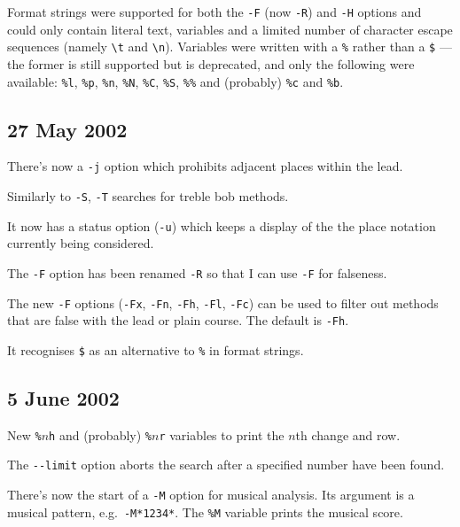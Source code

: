 \documentclass[a4paper,11pt,oneside]{book}
\begin{document}
Format strings were supported for both the \verb+-F+ (now \verb+-R+) and 
\verb+-H+ options and could only contain literal text, variables
and a limited number of character escape sequences (namely \verb+\t+ and 
\verb+\n+).
Variables were written with a \verb+%+ rather than a \verb+$+ — the former
is still supported but is deprecated, and only the following were available:
\verb+%l+, \verb+%p+, \verb+%n+, \verb+%N+, \verb+%C+, \verb+%S+, \verb+%%+ 
and (probably) \verb+%c+ and \verb+%b+.

\subsection{27 May 2002}
\begin{list}{}{\leftmargin=1em\itemsep=0em}
\item There's now a \verb+-j+ option which prohibits adjacent places 
within the lead.
\item Similarly to \verb+-S+, \verb+-T+ searches for treble bob methods.
\item It now has a status option (\verb+-u+) which keeps a display of the 
the place notation currently being considered.
\item The \verb+-F+ option has been renamed \verb+-R+ so that I can use 
\verb+-F+ for falseness.
\item The new \verb+-F+ options (\verb+-Fx+, \verb+-Fn+, \verb+-Fh+, 
\verb+-Fl+, \verb+-Fc+) can be used to filter out methods that are 
false with the lead or plain course.  The default is \verb+-Fh+.
\item It recognises \verb+$+ as an alternative to \verb+%+ in format strings.
\end{list}

\subsection{5 June 2002}
\begin{list}{}{\leftmargin=1em\itemsep=0em}
\item New \verb+%+$n$\verb+h+ and (probably) \verb+%+$n$\verb+r+ variables 
to print the $n$th change and row.
\item The \verb+--limit+ option aborts the search after a specified number
have been found.
\item There's now the start of a \verb+-M+ option for musical analysis.  Its 
argument is a musical pattern, e.g.\ \verb+-M*1234*+.  The \verb+%M+ variable
prints the musical score.
\end{list}
\end{document}
